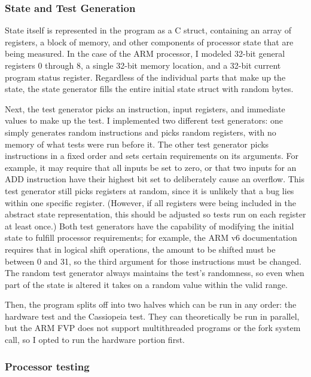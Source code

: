 \documentclass[letterpaper,12pt]{article}
\begin{document}
\subsubsection{State and Test Generation}

State itself is represented in the program as a C struct, containing an array of registers, a block of memory, and other components of processor state that are being measured. In the case of the ARM processor, I modeled 32-bit general registers 0 through 8, a single 32-bit memory location, and a 32-bit current program status register. Regardless of the individual parts that make up the state, the state generator fills the entire initial state struct with random bytes.

Next, the test generator picks an instruction, input registers, and immediate values to make up the test. I implemented two different test generators: one simply generates random instructions and picks random registers, with no memory of what tests were run before it. The other test generator picks instructions in a fixed order and sets certain requirements on its arguments. For example, it may require that all inputs be set to zero, or that two inputs for an ADD instruction have their highest bit set to deliberately cause an overflow. This test generator still picks registers at random, since it is unlikely that a bug lies within one specific register. (However, if all registers were being included in the abstract state representation, this should be adjusted so tests run on each register at least once.) Both test generators have the capability of modifying the initial state to fulfill processor requirements; for example, the ARM v6 documentation requires that in logical shift operations, the amount to be shifted must be between 0 and 31, so the third argument for those instructions must be changed. The random test generator always maintains the test's randomness, so even when part of the state is altered it takes on a random value within the valid range.

Then, the program splits off into two halves which can be run in any order: the hardware test and the Cassiopeia test. They can theoretically be run in parallel, but the ARM FVP does not support multithreaded programs or the fork system call, so I opted to run the hardware portion first. 

\subsubsection{Processor testing}
\end{document}
